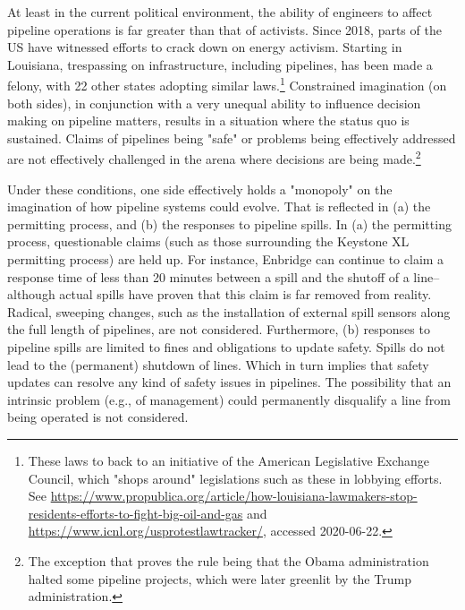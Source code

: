 \documentclass[12pt, man, natbib]{apa6}
\begin{document}
	At least in the current political environment, the ability of engineers to affect pipeline operations is far greater than that of activists. Since 2018, parts of the US have witnessed efforts to crack down on energy activism. Starting in Louisiana, trespassing on infrastructure, including pipelines, has been made a felony, with 22 other states adopting similar laws.\footnote{These laws to back to an initiative of the American Legislative Exchange Council, which "shops around" legislations such as these in lobbying efforts. See \url{https://www.propublica.org/article/how-louisiana-lawmakers-stop-residents-efforts-to-fight-big-oil-and-gas} and \url{https://www.icnl.org/usprotestlawtracker/}, accessed 2020-06-22.} Constrained imagination (on both sides), in conjunction with a very unequal ability to influence decision making on pipeline matters, results in a situation where the status quo is sustained. Claims of pipelines being "safe" or problems being effectively addressed are not effectively challenged in the arena where decisions are being made.\footnote{The exception that proves the rule being that the Obama administration halted some pipeline projects, which were later greenlit by the Trump administration.} 
	
	Under these conditions, one side effectively holds a "monopoly" on the imagination of how pipeline systems could evolve. That is reflected in (a) the permitting process, and (b) the responses to pipeline spills. In (a) the permitting process, questionable claims (such as those surrounding the Keystone XL permitting process) are held up. For instance, Enbridge can continue to claim a response time of less than 20 minutes between a spill and the shutoff of a line--although actual spills have proven that this claim is far removed from reality\citep{Stansbury2011}. Radical, sweeping changes, such as the installation of external spill sensors along the full length of pipelines, are not considered. Furthermore, (b) responses to pipeline spills are limited to fines and obligations to update safety. Spills do not lead to the (permanent) shutdown of lines. Which in turn implies that safety updates can resolve any kind of safety issues in pipelines. The possibility that an intrinsic problem (e.g., of management) could permanently disqualify a line from being operated is not considered.
	
\end{document}
